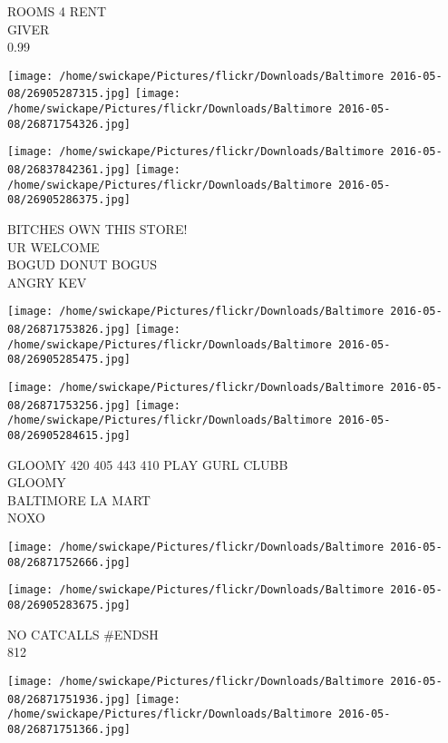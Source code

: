 \documentclass[10pt,letterpaper]{article}
\begin{document}
ROOMS 4 RENT\\
GIVER\\
0.99\\
\pagebreak

\texttt{[image: /home/swickape/Pictures/flickr/Downloads/Baltimore 2016-05-08/26905287315.jpg]}
\texttt{[image: /home/swickape/Pictures/flickr/Downloads/Baltimore 2016-05-08/26871754326.jpg]}

\texttt{[image: /home/swickape/Pictures/flickr/Downloads/Baltimore 2016-05-08/26837842361.jpg]}
\texttt{[image: /home/swickape/Pictures/flickr/Downloads/Baltimore 2016-05-08/26905286375.jpg]}

BITCHES OWN THIS STORE!\\
UR WELCOME\\
BOGUD DONUT BOGUS\\
ANGRY KEV\\
\pagebreak

\texttt{[image: /home/swickape/Pictures/flickr/Downloads/Baltimore 2016-05-08/26871753826.jpg]}
\texttt{[image: /home/swickape/Pictures/flickr/Downloads/Baltimore 2016-05-08/26905285475.jpg]}

\texttt{[image: /home/swickape/Pictures/flickr/Downloads/Baltimore 2016-05-08/26871753256.jpg]}
\texttt{[image: /home/swickape/Pictures/flickr/Downloads/Baltimore 2016-05-08/26905284615.jpg]}

GLOOMY 420 405 443 410 PLAY GURL CLUBB\\
GLOOMY\\
BALTIMORE LA MART\\
NOXO\\
\pagebreak

\texttt{[image: /home/swickape/Pictures/flickr/Downloads/Baltimore 2016-05-08/26871752666.jpg]}

\vspace{0.25in}
\texttt{[image: /home/swickape/Pictures/flickr/Downloads/Baltimore 2016-05-08/26905283675.jpg]}

NO CATCALLS \#ENDSH\\
812\\
\pagebreak

\texttt{[image: /home/swickape/Pictures/flickr/Downloads/Baltimore 2016-05-08/26871751936.jpg]}
\texttt{[image: /home/swickape/Pictures/flickr/Downloads/Baltimore 2016-05-08/26871751366.jpg]}
\end{document}
